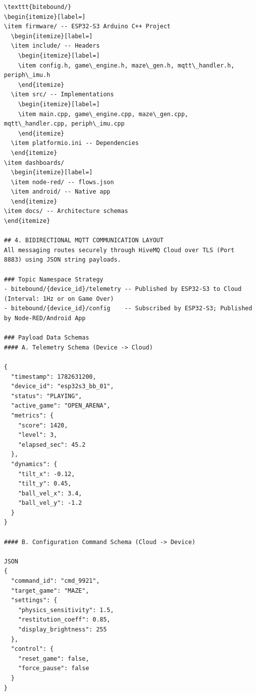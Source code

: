 \begin{lstlisting}[language={}, breaklines=true]
\texttt{bitebound/}
\begin{itemize}[label=]
\item firmware/ -- ESP32-S3 Arduino C++ Project
  \begin{itemize}[label=]
  \item include/ -- Headers
    \begin{itemize}[label=]
    \item config.h, game\_engine.h, maze\_gen.h, mqtt\_handler.h, periph\_imu.h
    \end{itemize}
  \item src/ -- Implementations
    \begin{itemize}[label=]
    \item main.cpp, game\_engine.cpp, maze\_gen.cpp, mqtt\_handler.cpp, periph\_imu.cpp
    \end{itemize}
  \item platformio.ini -- Dependencies
  \end{itemize}
\item dashboards/
  \begin{itemize}[label=]
  \item node-red/ -- flows.json
  \item android/ -- Native app
  \end{itemize}
\item docs/ -- Architecture schemas
\end{itemize}

## 4. BIDIRECTIONAL MQTT COMMUNICATION LAYOUT
All messaging routes securely through HiveMQ Cloud over TLS (Port 8883) using JSON string payloads.

### Topic Namespace Strategy
- bitebound/{device_id}/telemetry -- Published by ESP32-S3 to Cloud (Interval: 1Hz or on Game Over)
- bitebound/{device_id}/config    -- Subscribed by ESP32-S3; Published by Node-RED/Android App

### Payload Data Schemas
#### A. Telemetry Schema (Device -> Cloud)

{
  "timestamp": 1782631200,
  "device_id": "esp32s3_bb_01",
  "status": "PLAYING",
  "active_game": "OPEN_ARENA",
  "metrics": {
    "score": 1420,
    "level": 3,
    "elapsed_sec": 45.2
  },
  "dynamics": {
    "tilt_x": -0.12,
    "tilt_y": 0.45,
    "ball_vel_x": 3.4,
    "ball_vel_y": -1.2
  }
}

#### B. Configuration Command Schema (Cloud -> Device)

JSON
{
  "command_id": "cmd_9921",
  "target_game": "MAZE",
  "settings": {
    "physics_sensitivity": 1.5,
    "restitution_coeff": 0.85,
    "display_brightness": 255
  },
  "control": {
    "reset_game": false,
    "force_pause": false
  }
}


\end{lstlisting}
